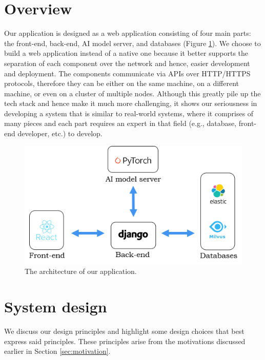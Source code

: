 \section{Overview}
\label{sec:FIRST_overview}

Our application is designed as a web application consisting of four main parts: the front-end, back-end, AI model server, and databases (Figure \ref{fig:Retrieval_architecture}). We choose to build a web application instead of a native one because it better supports the separation of each component over the network and hence, easier development and deployment. The components communicate via APIs over HTTP/HTTPS protocols, therefore they can be either on the same machine, on a different machine, or even on a cluster of multiple nodes. Although this greatly pile up the tech stack and hence make it much more challenging, it shows our seriousness in developing a system that is similar to real-world systems, where it comprises of many pieces and each part requires an expert in that field (e.g., database, front-end developer, etc.) to develop.

\begin{figure}[ht]
    \centering
    \includegraphics[width=\textwidth]{content/resources/images/methods/architecture.png}
    \caption{The architecture of our application.}
    \label{fig:Retrieval_architecture}
\end{figure}

\section{System design}
\label{sec:first_system_design}

\vspace{-2mm}
We discuss our design principles and highlight some design choices that best express said principles. These principles arise from the motivations discussed earlier in Section \ref{sec:motivation}.


